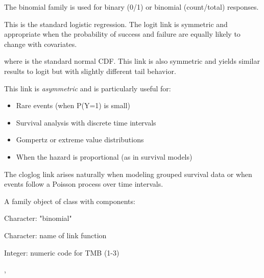 \documentclass[a4paper]{book}
\begin{document}
%
\begin{Details}
The binomial family is used for binary (0/1) or binomial (count/total) responses.

This is the standard logistic regression. The logit link is symmetric and
appropriate when the probability of success and failure are equally likely
to change with covariates.

where \eqn{\Phi}{} is the standard normal CDF. This link is also symmetric
and yields similar results to logit but with slightly different tail behavior.

This link is \emph{asymmetric} and is particularly useful for:
\begin{itemize}

\item{} Rare events (when P(Y=1) is small)
\item{} Survival analysis with discrete time intervals
\item{} Gompertz or extreme value distributions
\item{} When the hazard is proportional (as in survival models)

\end{itemize}


The cloglog link arises naturally when modeling grouped survival data
or when events follow a Poisson process over time intervals.
\end{Details}
%
\begin{Value}
A family object of class  with components:
\begin{ldescription}
\item[\code{family}] Character: "binomial"
\item[\code{link}] Character: name of link function
\item[\code{link\_code}] Integer: numeric code for TMB (1-3)
\end{ldescription}
\end{Value}
%
\begin{SeeAlso}
, 
\end{SeeAlso}
%
\end{document}
